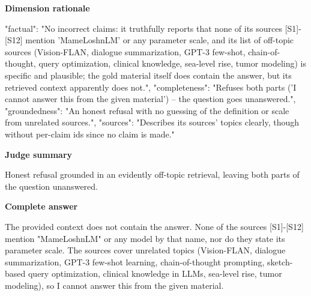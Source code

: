 \documentclass[10pt]{article}
\begin{document}
\textbf{Dimension rationale}
\begin{EvidenceText}
{
  "factual": "No incorrect claims: it truthfully reports that none of its sources [S1]-[S12] mention 'MameLoshnLM' or any parameter scale, and its list of off-topic sources (Vision-FLAN, dialogue summarization, GPT-3 few-shot, chain-of-thought, query optimization, clinical knowledge, sea-level rise, tumor modeling) is specific and plausible; the gold material itself does contain the answer, but its retrieved context apparently does not.",
  "completeness": "Refuses both parts ('I cannot answer this from the given material') -- the question goes unanswered.",
  "groundedness": "An honest refusal with no guessing of the definition or scale from unrelated sources.",
  "sources": "Describes its sources' topics clearly, though without per-claim ids since no claim is made."
}
\end{EvidenceText}

\textbf{Judge summary}
\begin{EvidenceText}
Honest refusal grounded in an evidently off-topic retrieval, leaving both parts of the question unanswered.
\end{EvidenceText}

\textbf{Complete answer}
\begin{AnswerText}
The provided context does not contain the answer. None of the sources [S1]-[S12] mention "MameLoshnLM" or any model by that name, nor do they state its parameter scale. The sources cover unrelated topics (Vision-FLAN, dialogue summarization, GPT-3 few-shot learning, chain-of-thought prompting, sketch-based query optimization, clinical knowledge in LLMs, sea-level rise, tumor modeling), so I cannot answer this from the given material.
\end{AnswerText}
\end{document}
